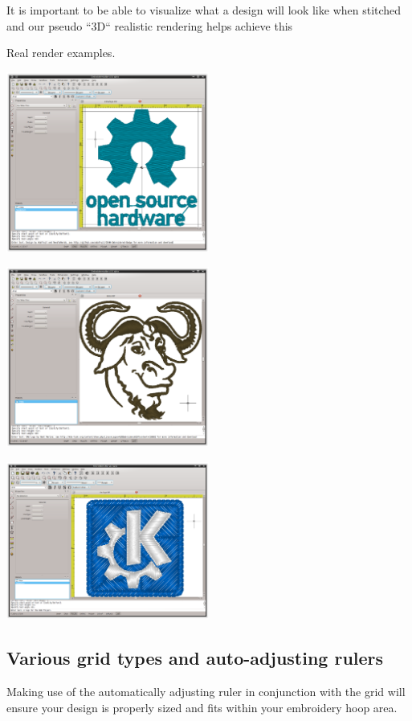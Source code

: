 \documentclass[10pt]{report}
\begin{document}
It is important to be able to visualize what a design will look like when stitched and our
pseudo ``3D`` realistic rendering helps achieve this

Real render examples.

\includegraphics[width=0.5\textwidth]{images/features-realrender-1.png}

\includegraphics[width=0.5\textwidth]{images/features-realrender-2.png}

\includegraphics[width=0.5\textwidth]{images/features-realrender-3.png}

\subsection{Various grid types and auto-adjusting rulers}

Making use of the automatically adjusting ruler in conjunction with the grid will ensure your
design is properly sized and fits within your embroidery hoop area.
\end{document}
